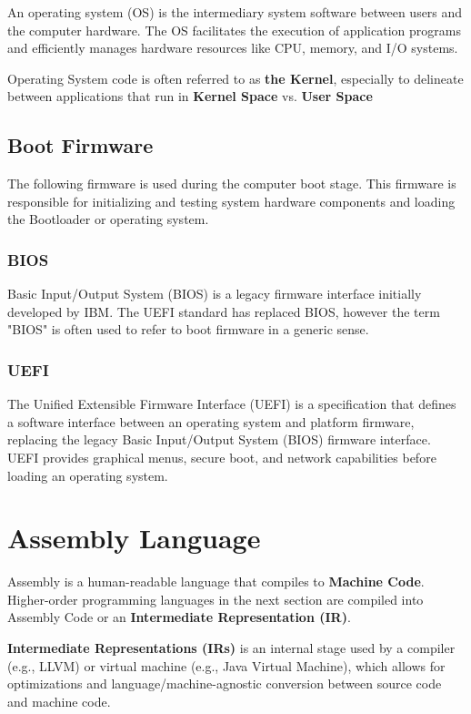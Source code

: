 \documentclass[pdftex,10pt]{article}
\begin{document}
An operating system (OS) is the intermediary system software between users and the computer hardware. The OS facilitates the execution of application programs and efficiently manages hardware resources like CPU, memory, and I/O systems.

Operating System code is often referred to as \textbf{the Kernel}, especially to delineate between applications that run in \textbf{Kernel Space} vs. \textbf{User Space}

\subsection{Boot Firmware}

The following firmware is used during the computer boot stage. This firmware is responsible for initializing and testing system hardware components and loading the Bootloader or operating system.

\subsubsection{BIOS}

Basic Input/Output System (BIOS) is a legacy firmware interface initially developed by IBM. The UEFI standard has replaced BIOS, however the term "BIOS" is often used to refer to boot firmware in a generic sense.

\subsubsection{UEFI}

The Unified Extensible Firmware Interface (UEFI) is a specification that defines a software interface between an operating system and platform firmware, replacing the legacy Basic Input/Output System (BIOS) firmware interface. UEFI provides graphical menus, secure boot, and network capabilities before loading an operating system.

\section{Assembly Language}

Assembly is a human-readable language that compiles to \textbf{Machine Code}. Higher-order programming languages in the next section are compiled into Assembly Code or an \textbf{Intermediate Representation (IR)}.

\textbf{Intermediate Representations (IRs)} is an internal stage used by a compiler (e.g., LLVM) or virtual machine (e.g., Java Virtual Machine), which allows for optimizations and language/machine-agnostic conversion between source code and machine code.
\end{document}
